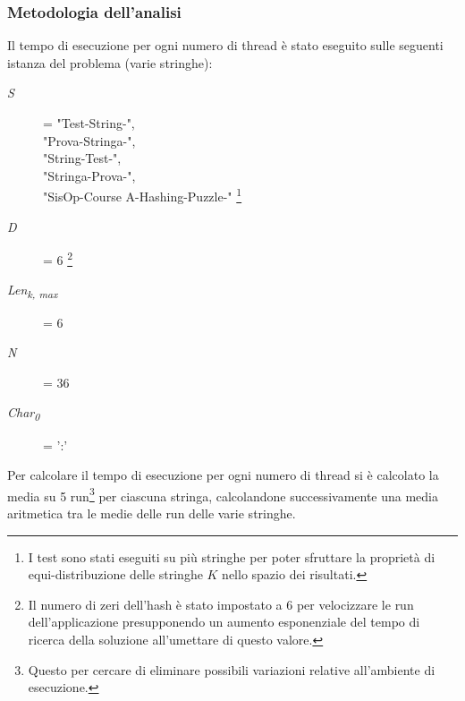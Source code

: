 \documentclass{article}
\begin{document}
   \subsubsection{Metodologia dell'analisi}
   Il tempo di esecuzione per ogni numero di thread è stato eseguito sulle seguenti istanza del problema (varie stringhe):
   \begin{description}
   \item[\textit{S}] = "Test-String-",\\ "Prova-Stringa-",\\ "String-Test-",\\ "Stringa-Prova-",\\ "SisOp-Course A-Hashing-Puzzle-" \footnote{I test sono stati eseguiti su più stringhe per poter sfruttare la proprietà di equi-distribuzione delle stringhe $K$ nello spazio dei risultati.}
   \item[\textit{D}] = 6 \footnote{Il numero di zeri dell'hash è stato impostato a 6 per velocizzare le run dell'applicazione presupponendo un aumento esponenziale del tempo di ricerca della soluzione all'umettare di questo valore.}
   \item[\textit{Len\textsubscript{k, max}}] = 6
   \item[\textit{N}] = 36
   \item[\textit{Char\textsubscript{0}}] = ':'
   \end{description}

   Per calcolare il tempo di esecuzione per ogni numero di thread si è calcolato la media su 5 run\footnote{Questo per cercare di eliminare possibili variazioni relative all'ambiente di esecuzione.} per ciascuna stringa, calcolandone successivamente una media aritmetica tra le medie delle run delle varie stringhe.
\end{document}

